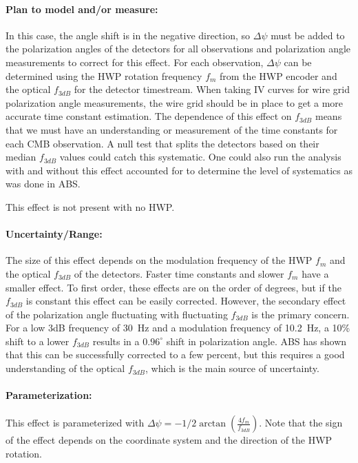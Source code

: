 \paragraph{Plan to model and/or measure:}

In this case, the angle shift is in the negative direction, so $\Delta \psi$ must be added to the polarization angles of the detectors for all observations and polarization angle measurements to correct for this effect. For each observation, $\Delta \psi$ can be determined using the HWP rotation frequency $f_{m}$ from the HWP encoder and the optical $f_{3dB}$ for the detector timestream. When taking IV curves for wire grid polarization angle measurements, the wire grid should be in place to get a more accurate time constant estimation. The dependence of this effect on $f_{3dB}$ means that we must have an understanding or measurement of the time constants for each CMB observation. A null test that splits the detectors based on their median $f_{3dB}$ values could catch this systematic. One could also run the analysis with and without this effect accounted for to determine the level of systematics as was done in ABS.

This effect is not present with no HWP.

\paragraph{Uncertainty/Range:}
The size of this effect depends on the modulation frequency of the HWP $f_{m}$ and the optical $f_{3dB}$ of the detectors. Faster time constants and slower $f_{m}$ have a smaller effect. To first order, these effects are on the order of degrees, but if the $f_{3dB}$ is constant this effect can be easily corrected. However, the secondary effect of the polarization angle fluctuating with fluctuating $f_{3dB}$ is the primary concern. For a low 3dB frequency of 30~Hz and a modulation frequency of 10.2~Hz, a 10\% shift to a lower $f_{3dB}$ results in a $0.96^{\circ}$ shift in polarization angle. ABS has shown that this can be successfully corrected to a few percent, but this requires a good understanding of the optical $f_{3dB}$, which is the main source of uncertainty.

\paragraph{Parameterization:}
This effect is parameterized with $\Delta \psi=-1/2\arctan{\left(\frac{4f_{m}}{f_{3dB}}\right)}$. Note that the sign of the effect depends on the coordinate system and the direction of the HWP rotation.
